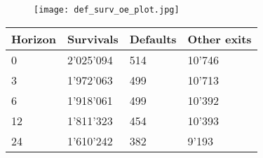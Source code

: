 \begin{figure}[H]
    \centering
    \texttt{[image: def\_surv\_oe\_plot.jpg]}
    \label{fig:defsurv}
\end{figure}

\begin{table}[]
    \centering
    \begin{tabular}{l l l l}
    \hline\hline
Horizon & Survivals & Defaults & Other exits \\
    \hline
0 &  2'025'094 & 514 & 10'746\\
3 &  1'972'063 & 499 & 10'713\\
6 &  1'918'061 & 499 & 10'392\\
12 &  1'811'323 & 454 & 10'393\\
24 &  1'610'242 & 382 & 9'193\\

\end{tabular}
\end{table}
